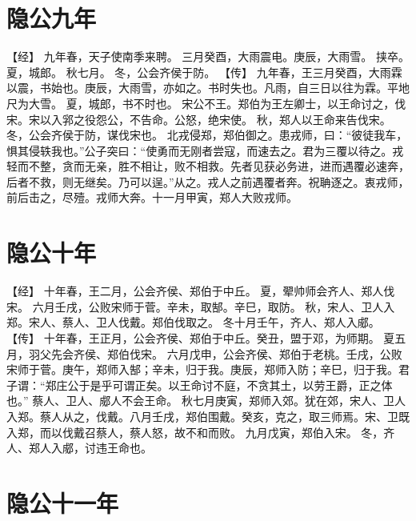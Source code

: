 \documentclass[a4paper,12pt,UTF8,twoside]{ctexbook}
\begin{document}
\section{隐公九年}

【经】
九年春，天子使南季来聘。
三月癸酉，大雨震电。庚辰，大雨雪。
挟卒。
夏，城郎。
秋七月。
冬，公会齐侯于防。
【传】
九年春，王三月癸酉，大雨霖以震，书始也。庚辰，大雨雪，亦如之。书时失也。凡雨，自三日以往为霖。平地尺为大雪。
夏，城郎，书不时也。
宋公不王。郑伯为王左卿士，以王命讨之，伐宋。宋以入郛之役怨公，不告命。公怒，绝宋使。
秋，郑人以王命来告伐宋。
冬，公会齐侯于防，谋伐宋也。
北戎侵郑，郑伯御之。患戎师，曰：“彼徒我车，惧其侵轶我也。”公子突曰：“使勇而无刚者尝寇，而速去之。君为三覆以待之。戎轻而不整，贪而无亲，胜不相让，败不相救。先者见获必务进，进而遇覆必速奔，后者不救，则无继矣。乃可以逞。”从之。戎人之前遇覆者奔。祝聃逐之。衷戎师，前后击之，尽殪。戎师大奔。十一月甲寅，郑人大败戎师。

\section{隐公十年}

【经】
十年春，王二月，公会齐侯、郑伯于中丘。
夏，翚帅师会齐人、郑人伐宋。
六月壬戌，公败宋师于菅。辛未，取郜。辛巳，取防。
秋，宋人、卫人入郑。宋人、蔡人、卫人伐戴。郑伯伐取之。
冬十月壬午，齐人、郑人入郕。
【传】
十年春，王正月，公会齐侯、郑伯于中丘。癸丑，盟于邓，为师期。
夏五月，羽父先会齐侯、郑伯伐宋。
六月戊申，公会齐侯、郑伯于老桃。壬戌，公败宋师于菅。庚午，郑师入郜；辛未，归于我。庚辰，郑师入防；辛巳，归于我。君子谓：“郑庄公于是乎可谓正矣。以王命讨不庭，不贪其土，以劳王爵，正之体也。”
蔡人、卫人、郕人不会王命。
秋七月庚寅，郑师入郊。犹在郊，宋人、卫人入郑。蔡人从之，伐戴。八月壬戌，郑伯围戴。癸亥，克之，取三师焉。宋、卫既入郑，而以伐戴召蔡人，蔡人怒，故不和而败。
九月戊寅，郑伯入宋。
冬，齐人、郑人入郕，讨违王命也。

\section{隐公十一年}
\end{document}
